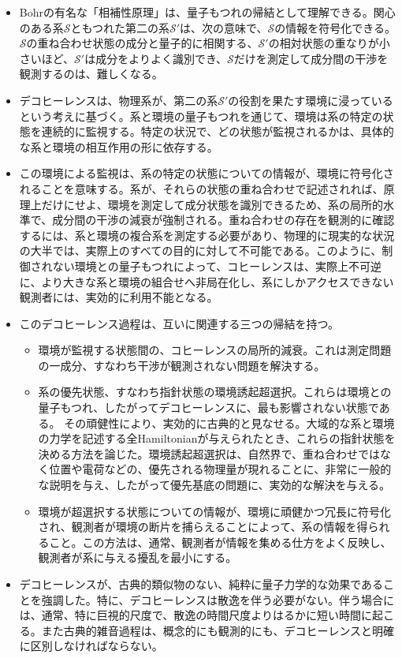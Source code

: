 \begin{itemize}
\item Bohrの有名な「相補性原理」は、量子もつれの帰結として理解できる。関心のある系$\mathcal S$ともつれた第二の系$\mathcal S'$は、次の意味で、$\mathcal S$の情報を符号化できる。$\mathcal S$の重ね合わせ状態の成分と量子的に相関する、$\mathcal S'$の相対状態の重なりが小さいほど、$\mathcal S'$は成分をよりよく識別でき、$\mathcal S$だけを測定して成分間の干渉を観測するのは、難しくなる。
\item デコヒーレンスは、物理系が、第二の系$\mathcal S'$の役割を果たす環境に浸っているという考えに基づく。系と環境の量子もつれを通じて、環境は系の特定の状態を連続的に監視する。特定の状況で、どの状態が監視されるかは、具体的な系と環境の相互作用の形に依存する。
\item この環境による監視は、系の特定の状態についての情報が、環境に符号化されることを意味する。系が、それらの状態の重ね合わせで記述されれば、原理上だけにせよ、環境を測定して成分状態を識別できるため、系の局所的水準で、成分間の干渉の減衰が強制される。重ね合わせの存在を観測的に確認するには、系と環境の複合系を測定する必要があり、物理的に現実的な状況の大半では、実際上のすべての目的に対して不可能である。このように、制御されない環境との量子もつれによって、コヒーレンスは、実際上不可逆に、より大きな系と環境の組合せへ非局在化し、系にしかアクセスできない観測者には、実効的に利用不能となる。
\item このデコヒーレンス過程は、互いに関連する三つの帰結を持つ。
\begin{itemize}
\item 環境が監視する状態間の、コヒーレンスの局所的減衰。これは測定問題の一成分、すなわち干渉が観測されない問題を解決する。
\item 系の優先状態、すなわち指針状態の環境誘起超選択。これらは環境との量子もつれ、したがってデコヒーレンスに、最も影響されない状態である。
\hypertarget{srcpage:114}{}\label{srcpage:114}
その頑健性により、実効的に古典的と見なせる。大域的な系と環境の力学を記述する全Hamiltonianが与えられたとき、これらの指針状態を決める方法を論じた。環境誘起超選択は、自然界で、重ね合わせではなく位置や電荷などの、優先される物理量が現れることに、非常に一般的な説明を与え、したがって優先基底の問題に、実効的な解決を与える。
\item 環境が超選択する状態についての情報が、環境に頑健かつ冗長に符号化され、観測者が環境の断片を捕らえることによって、系の情報を得られること。この方法は、通常、観測者が情報を集める仕方をよく反映し、観測者が系に与える擾乱を最小にする。
\end{itemize}
\item デコヒーレンスが、古典的類似物のない、純粋に量子力学的な効果であることを強調した。特に、デコヒーレンスは散逸を伴う必要がない。伴う場合には、通常、特に巨視的尺度で、散逸の時間尺度よりはるかに短い時間に起こる。また古典的雑音過程は、概念的にも観測的にも、デコヒーレンスと明確に区別しなければならない。
\end{itemize}
